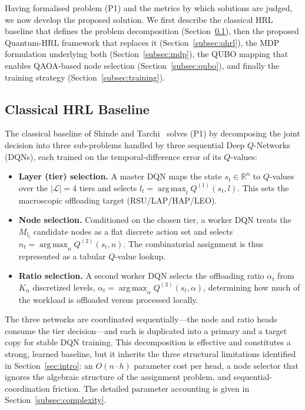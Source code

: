 \documentclass[11pt,a4paper]{article}
\theoremstyle{definition}
\newcommand{\R}{\mathbb{R}}
\DeclareMathOperator*{\argmax}{arg\,max}
\begin{document}
Having formalised problem (P1) and the metrics by which solutions are judged, we now develop the proposed solution. We first describe the classical HRL baseline that defines the problem decomposition (Section~\ref{subsec:classical}), then the proposed Quantum-HRL framework that replaces it (Section~\ref{subsec:qhrl}), the MDP formulation underlying both (Section~\ref{subsec:mdp}), the QUBO mapping that enables QAOA-based node selection (Section~\ref{subsec:qubo}), and finally the training strategy (Section~\ref{subsec:training}).

\subsection{Classical HRL Baseline}
\label{subsec:classical}

The classical baseline of Shinde and Tarchi~\cite{hrl_ntn} solves (P1) by decomposing the joint decision into three sub-problems handled by three sequential Deep $Q$-Networks (DQNs), each trained on the temporal-difference error of its $Q$-values:
\begin{itemize}
  \item \textbf{Layer (tier) selection.} A master DQN maps the state $s_t\in\R^n$ to $Q$-values over the $|\mathcal L|=4$ tiers and selects $l_t=\argmax_l Q^{(1)}(s_t,l)$. This sets the macroscopic offloading target (RSU/LAP/HAP/LEO).
  \item \textbf{Node selection.} Conditioned on the chosen tier, a worker DQN treats the $M_{l_t}$ candidate nodes as a flat discrete action set and selects $n_t=\argmax_n Q^{(2)}(s_t,n)$. The combinatorial assignment is thus represented as a tabular $Q$-value lookup.
  \item \textbf{Ratio selection.} A second worker DQN selects the offloading ratio $\alpha_t$ from $K_\alpha$ discretized levels, $\alpha_t=\argmax_\alpha Q^{(3)}(s_t,\alpha)$, determining how much of the workload is offloaded versus processed locally.
\end{itemize}
The three networks are coordinated sequentially---the node and ratio heads consume the tier decision---and each is duplicated into a primary and a target copy for stable DQN training. This decomposition is effective and constitutes a strong, learned baseline, but it inherits the three structural limitations identified in Section~\ref{sec:intro}: an $O(n\cdot h)$ parameter cost per head, a node selector that ignores the algebraic structure of the assignment problem, and sequential-coordination friction. The detailed parameter accounting is given in Section~\ref{subsec:complexity}.
\end{document}
